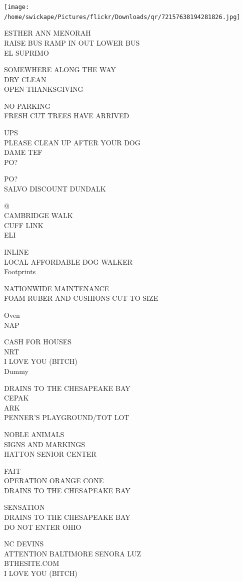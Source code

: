 \documentclass[10pt,letterpaper]{article}
\begin{document}
\texttt{[image: /home/swickape/Pictures/flickr/Downloads/qr/72157638194281826.jpg]}
\

ESTHER ANN MENORAH\\
RAISE BUS RAMP IN OUT LOWER BUS\\
EL SUPRIMO

SOMEWHERE ALONG THE WAY\\
DRY CLEAN\\
OPEN THANKSGIVING

NO PARKING\\
FRESH CUT TREES HAVE ARRIVED

UPS\\
PLEASE CLEAN UP AFTER YOUR DOG\\
DAME TEF\\
PO?

PO?\\
SALVO DISCOUNT DUNDALK

@\\
CAMBRIDGE WALK\\
CUFF LINK\\
ELI

INLINE\\
LOCAL AFFORDABLE DOG WALKER\\
Footprints

NATIONWIDE MAINTENANCE\\
FOAM RUBER AND CUSHIONS CUT TO SIZE

Oven\\
NAP

CASH FOR HOUSES\\
NRT\\
I LOVE YOU (BITCH)\\
Dummy

DRAINS TO THE CHESAPEAKE BAY\\
CEPAK\\
ARK\\
PENNER'S PLAYGROUND/TOT LOT

NOBLE ANIMALS\\
SIGNS AND MARKINGS\\
HATTON SENIOR CENTER

FAIT\\
OPERATION ORANGE CONE\\
DRAINS TO THE CHESAPEAKE BAY

SENSATION\\
DRAINS TO THE CHESAPEAKE BAY\\
DO NOT ENTER OHIO

NC DEVINS\\
ATTENTION BALTIMORE SENORA LUZ\\
BTHESITE.COM\\
I LOVE YOU (BITCH)
\end{document}
